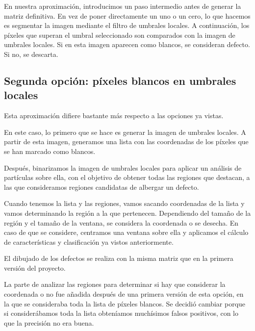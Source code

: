 En nuestra aproximación, introducimos un paso intermedio antes de generar la matriz definitiva. En vez de poner directamente un uno o un cero, lo que hacemos es segmentar la imagen mediante el filtro de umbrales locales. A continuación, los píxeles que superan el umbral seleccionado son comparados con la imagen de umbrales locales. Si en esta imagen aparecen como blancos, se consideran defecto. Si no, se descarta.

\subsection{Segunda opción: píxeles blancos en umbrales locales}
Esta aproximación difiere bastante más respecto a las opciones ya vistas.

En este caso, lo primero que se hace es generar la imagen de umbrales locales. A partir de esta imagen, generamos una lista con las coordenadas de los píxeles que se han marcado como blancos.

Después, binarizamos la imagen de umbrales locales para aplicar un análisis de partículas sobre ella, con el objetivo de obtener todas las regiones que destacan, a las que consideramos regiones candidatas de albergar un defecto.

Cuando tenemos la lista y las regiones, vamos sacando coordenadas de la lista y vamos determinando la región a la que pertenecen. Dependiendo del tamaño de la región y el tamaño de la ventana, se considera la coordenada o se desecha. En caso de que se considere, centramos una ventana sobre ella y aplicamos el cálculo de características y clasificación ya vistos anteriormente.


El dibujado de los defectos se realiza con la misma matriz que en la primera versión del proyecto.

La parte de analizar las regiones para determinar si hay que considerar la coordenada o no fue añadida después de una primera versión de esta opción, en la que se consideraba toda la lista de píxeles blancos. Se decidió cambiar porque si considerábamos toda la lista obteníamos muchísimos falsos positivos, con lo que la precisión no era buena.

